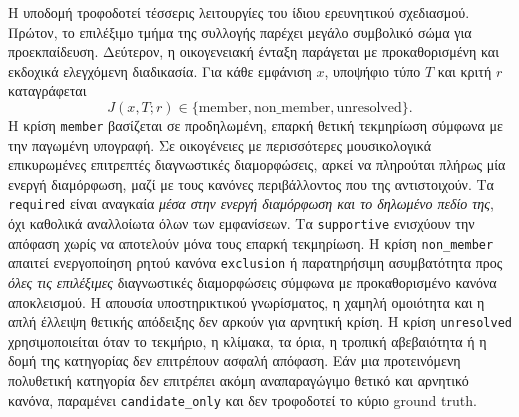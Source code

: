 \documentclass[11pt,a4paper]{article}
\begin{document}
Η υποδομή τροφοδοτεί τέσσερις λειτουργίες του ίδιου ερευνητικού σχεδιασμού. Πρώτον, το επιλέξιμο τμήμα της συλλογής παρέχει μεγάλο συμβολικό σώμα για προεκπαίδευση. Δεύτερον, η οικογενειακή ένταξη παράγεται με προκαθορισμένη και εκδοχικά ελεγχόμενη διαδικασία. Για κάθε εμφάνιση $x$, υποψήφιο τύπο $T$ και κριτή $r$ καταγράφεται
\[
J(x,T;r)\in\{\mathrm{member},\mathrm{non\_member},\mathrm{unresolved}\}.
\]
Η κρίση \texttt{member} βασίζεται σε προδηλωμένη, επαρκή θετική τεκμηρίωση σύμφωνα με την παγωμένη υπογραφή. Σε οικογένειες με περισσότερες μουσικολογικά επικυρωμένες επιτρεπτές διαγνωστικές διαμορφώσεις, αρκεί να πληρούται πλήρως μία ενεργή διαμόρφωση, μαζί με τους κανόνες περιβάλλοντος που της αντιστοιχούν. Τα \texttt{required} είναι αναγκαία \emph{μέσα στην ενεργή διαμόρφωση και το δηλωμένο πεδίο της}, όχι καθολικά αναλλοίωτα όλων των εμφανίσεων. Τα \texttt{supportive} ενισχύουν την απόφαση χωρίς να αποτελούν μόνα τους επαρκή τεκμηρίωση. Η κρίση \texttt{non\_member} απαιτεί ενεργοποίηση ρητού κανόνα \texttt{exclusion} ή παρατηρήσιμη ασυμβατότητα προς \emph{όλες τις επιλέξιμες} διαγνωστικές διαμορφώσεις σύμφωνα με προκαθορισμένο κανόνα αποκλεισμού. Η απουσία υποστηρικτικού γνωρίσματος, η χαμηλή ομοιότητα και η απλή έλλειψη θετικής απόδειξης δεν αρκούν για αρνητική κρίση. Η κρίση \texttt{unresolved} χρησιμοποιείται όταν το τεκμήριο, η κλίμακα, τα όρια, η τροπική αβεβαιότητα ή η δομή της κατηγορίας δεν επιτρέπουν ασφαλή απόφαση. Εάν μια προτεινόμενη πολυθετική κατηγορία δεν επιτρέπει ακόμη αναπαραγώγιμο θετικό και αρνητικό κανόνα, παραμένει \texttt{candidate\_only} και δεν τροφοδοτεί το κύριο ground truth.
\end{document}
